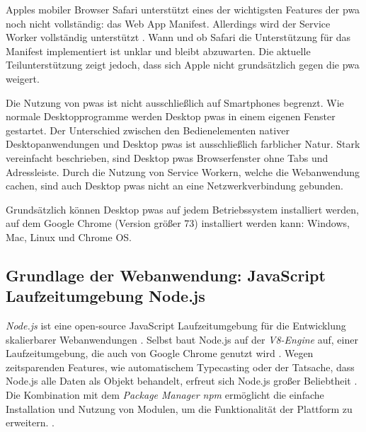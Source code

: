 Apples mobiler Browser Safari unterstützt eines der wichtigsten Features der \ac{pwa} noch nicht vollständig: das Web App Manifest. Allerdings wird der Service Worker vollständig unterstützt \cite{CanIUseWebManifest}. Wann und ob Safari die Unterstützung für das Manifest implementiert ist unklar und bleibt abzuwarten. Die aktuelle Teilunterstützung zeigt jedoch, dass sich Apple nicht grundsätzlich gegen die \ac{pwa} weigert.





Die Nutzung von \ac{pwa}s ist nicht ausschließlich auf Smartphones begrenzt. Wie normale Desktopprogramme werden Desktop \ac{pwa}s in einem eigenen Fenster gestartet. 
Der Unterschied zwischen den Bedienelementen nativer Desktopanwendungen und Desktop \ac{pwa}s ist ausschließlich farblicher Natur. Stark vereinfacht beschrieben, sind Desktop \ac{pwa}s Browserfenster ohne Tabs und Adressleiste. Durch die Nutzung von Service Workern, welche die Webanwendung cachen, sind auch Desktop \ac{pwa}s nicht an eine Netzwerkverbindung gebunden.

Grundsätzlich können Desktop \ac{pwa}s auf jedem Betriebssystem installiert werden, auf dem Google Chrome (Version größer 73) installiert werden kann: Windows, Mac, Linux und Chrome OS.
\cite{GooglePWADesktop}



\subsection{Grundlage der Webanwendung: JavaScript Laufzeitumgebung Node.js}

\textit{Node.js} ist eine open-source JavaScript Laufzeitumgebung für die Entwicklung skalierbarer Webanwendungen 
\cite{NodeJSWebsiteAbout}.
Selbst baut Node.js auf der \textit{V8-Engine} auf, einer Laufzeitumgebung, die auch von Google Chrome genutzt wird 
\cite[S. 1]{NodeJSRecepies}.
Wegen zeitsparenden Features, wie automatischem Typecasting oder der Tatsache, dass Node.js alle Daten als Objekt behandelt, erfreut sich Node.js großer Beliebtheit 
\cite[S. 12]{PracitalNodeJS}.
Die Kombination mit dem \textit{Package Manager npm} ermöglicht die einfache Installation und Nutzung von Modulen, um die Funktionalität der Plattform zu erweitern. 
\cite[S. 9]{NodeJSRecepies}.


